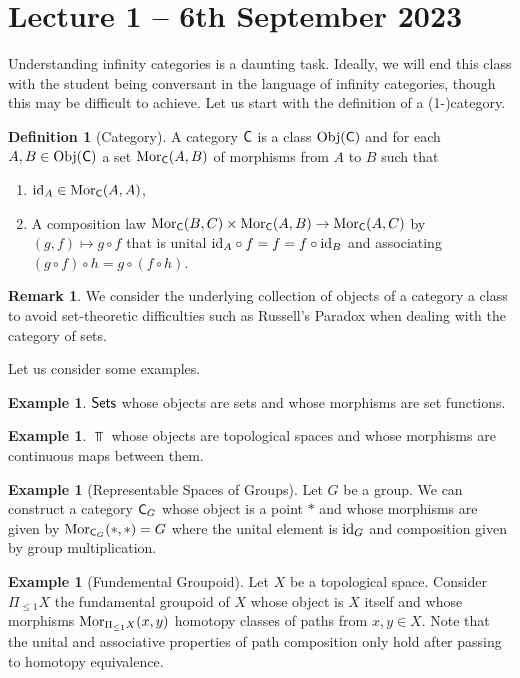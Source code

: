\documentclass{amsart}
\theoremstyle{definition}
\newtheorem{example}[theorem]{Example}
\newtheorem*{remark}{Remark}
\newtheorem{definition}[theorem]{Definition}
\numberwithin{equation}{section}
\begin{document}
\section{Lecture 1 -- 6th September 2023}
Understanding infinity categories is a daunting task. Ideally, we will end this class with the student being conversant in the language of infinity categories, though this may be difficult to achieve. Let us start with the definition of a (1-)category. 
\begin{definition}[Category]
    A category $\mathsf{C}$ is a class $\mathrm{Obj}(\mathsf{C})$ and for each $A,B\in\mathrm{Obj}(\mathsf{C})$ a set $\mathrm{Mor}_{\mathsf{C}}(A,B)$ of morphisms from $A$ to $B$ such that
    \begin{enumerate}[label=(\alph*)]
        \item $\mathrm{id}_{A}\in\mathrm{Mor}_{\mathsf{C}}(A,A)$,
        \item A composition law $\mathrm{Mor}_{\mathsf{C}}(B,C)\times\mathrm{Mor}_{\mathsf{C}}(A,B)\to\mathrm{Mor}_{\mathsf{C}}(A,C)$ by $(g,f)\mapsto g\circ f$ that is unital $\mathrm{id}_{A}\circ f=f=f\circ\mathrm{id}_{B}$ and associating $(g\circ f)\circ h=g\circ(f\circ h)$. 
    \end{enumerate}
\end{definition}
\begin{remark}
  We consider the underlying collection of objects of a category a class to avoid set-theoretic difficulties such as Russell's Paradox when dealing with the category of sets. 
\end{remark}
Let us consider some examples. 
\begin{example}
  $\mathsf{Sets}$ whose objects are sets and whose morphisms are set functions. 
\end{example}
\begin{example}
  $\Top$ whose objects are topological spaces and whose morphisms are continuous maps between them. 
\end{example}
\begin{example}[Representable Spaces of Groups]
Let $G$ be a group. We can construct a category $\mathsf{C}_{G}$ whose object is a point $*$ and whose morphisms are given by $\mathrm{Mor}_{\mathsf{C}_{G}}(*,*)=G$ where the unital element is $\mathrm{id}_{G}$ and composition given by group multiplication.
\end{example}
\begin{example}[Fundemental Groupoid]
Let $X$ be a topological space. Consider $\Pi_{\leq1}X$ the fundamental groupoid of $X$ whose object is $X$ itself and whose morphisms $\mathrm{Mor}_{\Pi_{\leq1}X}(x,y)$ homotopy classes of paths from $x,y\in X$. Note that the unital and associative properties of path composition only hold after passing to homotopy equivalence. 
\end{example}
\end{document}
